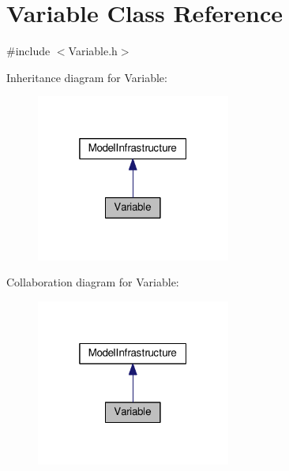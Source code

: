 \hypertarget{class_variable}{}\section{Variable Class Reference}
\label{class_variable}


{\ttfamily \#include $<$Variable.\+h$>$}



Inheritance diagram for Variable\+:
\nopagebreak
\begin{figure}[H]
\begin{center}
\leavevmode
\includegraphics[width=181pt]{class_variable__inherit__graph}
\end{center}
\end{figure}


Collaboration diagram for Variable\+:
\nopagebreak
\begin{figure}[H]
\begin{center}
\leavevmode
\includegraphics[width=181pt]{class_variable__coll__graph}
\end{center}
\end{figure}
